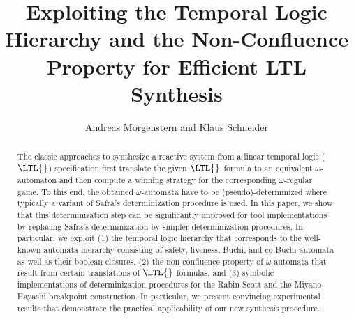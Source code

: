 \documentclass[copyright,creativecommons]{eptcs}
\begin{document}
\title{Exploiting the Temporal Logic Hierarchy and the Non-Confluence Property for Efficient LTL Synthesis}

\author{Andreas Morgenstern and Klaus Schneider
}
\def\titlerunning{Efficient $\LTL{}$ Synthesis}
\def\authorrunning{A. Morgenstern \& K. Schneider}

\newtheorem{definition}{Definition}
\newtheorem{proposition}{Proposition}
\newtheorem{lemma}{Lemma}
\newtheorem{theorem}{Theorem}
\newtheorem{corollary}{Corollary}
\newtheorem{remark}{Remark}
\newtheorem{example}{Example}
\def\qed{\hfill \rule{2mm}{2mm}}



\maketitle

\begin{abstract}
The classic approaches to synthesize a reactive system from a linear temporal logic ($\LTL{}$) specification first translate the given $\LTL{}$ formula to an equivalent $\omega$-automaton and then compute a winning strategy for the corresponding $\omega$-regular game. To this end, the obtained $\omega$-automata have to be (pseudo)-determinized where typically a variant of Safra's determinization procedure is used. In this paper, we show that this determinization step can be significantly improved for tool implementations by replacing Safra's determinization by simpler determinization procedures. In particular, we exploit (1) the temporal logic hierarchy that corresponds to the well-known automata hierarchy consisting of safety, liveness, Büchi, and co-Büchi automata as well as their boolean closures, (2) the non-confluence property of $\omega$-automata that result from certain translations of $\LTL{}$ formulas, and (3) symbolic implementations of determinization procedures for the Rabin-Scott and the Miyano-Hayashi breakpoint construction. In particular, we present convincing experimental results that demonstrate the practical applicability of our new synthesis procedure.
\end{abstract}
\end{document}

